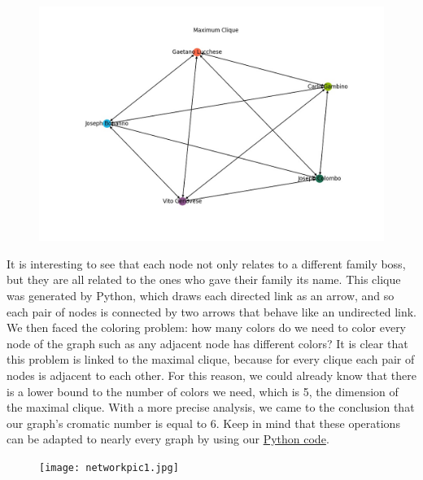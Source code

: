 \documentclass{article}
\begin{document}
\begin{figure}[h!]
\centering
\includegraphics[width=500pt]{maximum_clique.jpeg}
\advance\leftskip-2.5cm
\end{figure}



\noindent
It is interesting to see that each node not only relates to a different family boss, but they are all related to the ones who gave their family its name. This clique was generated by Python, which draws each directed link as an arrow, and so each pair of nodes is connected by two arrows that behave like an undirected link. We then faced the coloring problem: how many colors do we need to color every node of the graph such as any adjacent node has different colors? It is clear that this problem is linked to the maximal clique, because for every clique each pair of nodes is adjacent to each other. For this reason, we could already know that there is a lower bound to the number of colors we need, which is 5, the dimension of the maximal clique. With a more precise analysis, we came to the conclusion that our graph's cromatic number is equal to 6. Keep in mind that these operations can be adapted to nearly every graph by using our \href{https://github.com/TizianoIannaccio/Network-Analytics}{Python code}. 



\begin{figure}[t!]
\vspace{-250pt}
\centering
\texttt{[image: networkpic1.jpg]}
\advance\leftskip-3.52cm
\end{figure}
\end{document}
